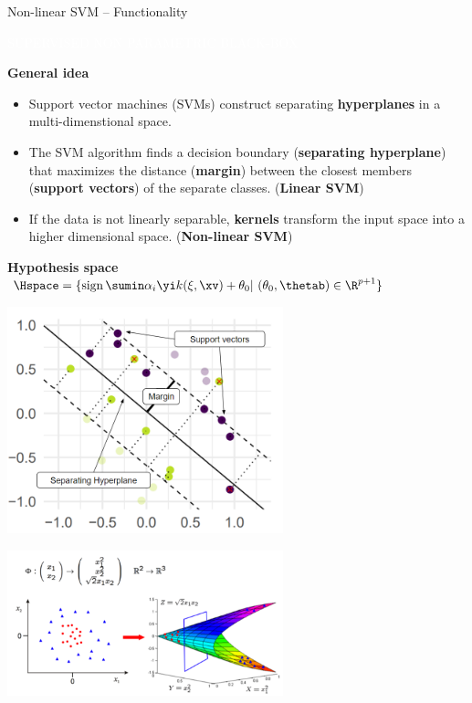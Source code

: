 \documentclass[11pt,compress,t,notes=noshow, xcolor=table]{beamer}
\newcommand{\maketag}[1]{\colorbox{highlightcol}{\textcolor{white}
{\MakeUppercase{#1}}}}
\newcommand{\highlight}[1]{\textcolor{highlightcol}{\textbf{#1}}}
\begin{document}
\begin{frame}{Non-linear SVM -- Functionality}

\footnotesize

\maketag{SUPERVISED}
\maketag{NON PARAMETRIC}
\maketag{BLACK-BOX}

\medskip

\highlight{General idea}
\begin{itemize}

\item Support vector machines (SVMs) construct separating \textbf{hyperplanes} in a multi-dimenstional space.  

\item The SVM algorithm finds a decision boundary (\textbf{separating hyperplane}) that maximizes the distance (\textbf{margin}) between the closest members (\textbf{support vectors}) of the separate classes. (\textbf{Linear SVM})

\item If the data is not linearly separable, \textbf{kernels} transform the input space into a higher dimensional space. (\textbf{Non-linear SVM})

\end{itemize}

\medskip


\highlight{Hypothesis space} ~~
\textcolor{red}{$\Hspace = \{ \operatorname{sign}\sumin \alpha_i \yi k(\xi, \xv)  + \theta_0  |\ (\theta_0, \thetab) \in \R^{p+1} \} $}

\medskip
 \footnotesize
 \begin{minipage}{0.4\textwidth}
\centering
 \includegraphics[width=0.6\textwidth]{figure/svm_wording.png}
 \end{minipage}
  \normalsize
 \begin{minipage}{0.5\textwidth}
 \centering
 \includegraphics[width=0.6\textwidth]{figure/svm_kernel.PNG}
   
 \end{minipage}

\end{frame}
\end{document}

